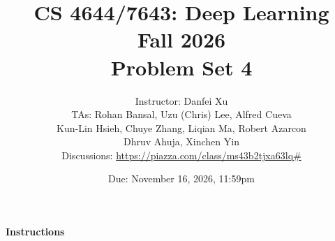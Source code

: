 \documentclass[11pt,english]{article}
\begin{document}
\title{CS 4644/7643: Deep Learning\\
Fall 2026 \\
Problem Set 4}

\author{Instructor: Danfei Xu \\
TAs: Rohan Bansal, Uzu (Chris) Lee, Alfred Cueva  \\
Kun-Lin Hsieh, Chuye Zhang, Liqian Ma, Robert Azarcon  \\
Dhruv Ahuja, Xinchen Yin \\
Discussions: \url{https://piazza.com/class/ms43b2tjxa63lq\#}}
\date{Due: November 16, 2026, 11:59pm}
\maketitle

\paragraph*{Instructions}
\end{document}
